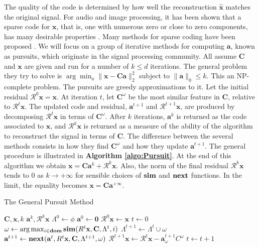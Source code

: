 \documentclass[runningheads,a4paper]{llncs}
\begin{document}
The quality of the code is determined by how well the reconstruction $\hat{\textbf{x}}$ matches the original signal. For audio and image processing, it has been shown that a sparse code for $\textbf{x}$, that is, one with numerous zero or close to zero components, has many desirable properties \cite{emergence-sparse-coding,sparse-coding-strategy-V1}. Many methods for sparse coding have been proposed \cite{undetermined-minimal-L1,sparse-coding-strategy-V1}. We will focus on a group of iterative methods for computing $\textbf{a}$, known as pursuits, which originate in the signal processing community. All assume $\textbf{C}$ and $\textbf{x}$ are given and run for a number of $k \leq d$ iterations. The general problem they try to solve is $\arg\min_a \|\textbf{x} - \textbf{C}\textbf{a}\|_2^2$ subject to $\|\textbf{a}\|_0 \leq k$. This an NP-complete problem. The pursuits are greedy approximations to it. Let the initial residual $\mathcal{R}^0\textbf{x} = \textbf{x}$. At iteration $t$, let $\textbf{C}^\omega$ be the most similar feature in $\textbf{C}$, relative to $\mathcal{R}^t\textbf{x}$. The updated code and residual, $\textbf{a}^{t+1}$ and $\mathcal{R}^{t+1}\textbf{x}$, are produced by decomposing $\mathcal{R}^t\textbf{x}$ in terms of $\textbf{C}^\omega$. After $k$ iterations, $\textbf{a}^k$ is returned as the code associated to $\textbf{x}$, and $\mathcal{R}^k\textbf{x}$ is returned as a measure of the ability of the algorithm to reconstruct the signal in terms of $\textbf{C}$. The difference between the several methods consists in how they find $\textbf{C}^\omega$ and how they update $\textbf{a}^{t+1}$. The general procedure is illustrated in \textbf{Algorithm \ref{algo:Pursuit}}. At the end of this algorithm we obtain $\textbf{x} = \textbf{C}\textbf{a}^k + \mathcal{R}^k\textbf{x}$. Also, the norm of the final residual $\mathcal{R}^k\textbf{x}$ tends to $0$ as $k \rightarrow +\infty$ for sensible choices of $\text{\textbf{sim}}$ and $\text{\textbf{next}}$ functions. In the limit, the equality becomes $\textbf{x} = \textbf{C}\textbf{a}^{+\infty}$. 

\begin{algorithm}
\caption{The General Pursuit Method}
\label{algo:Pursuit}
\begin{algorithmic}
\Require $\textbf{C},\textbf{x},k$
\Ensure $\textbf{a}^k,\mathcal{R}^k\textbf{x}$
\State $\Lambda^0 \gets \phi$
\State $\textbf{a}^0 \gets \textbf{0}$
\State $\mathcal{R}^0\textbf{x} \gets \textbf{x}$
\State $t \gets 0$
\State $\omega \gets \arg \max_{i \in \textbf{dom}} \text{\textbf{sim}}(R^t\textbf{x},\textbf{C},\Lambda^t,i)$
\State $\Lambda^{t+1} \gets \Lambda^t \cup \omega$
\State $\textbf{a}^{t+1} \gets \text{\textbf{next}}(\textbf{a}^t,R^t\textbf{x},\textbf{C},\Lambda^{t+1},\omega)$
\State $\mathcal{R}^{t+1}\textbf{x} \gets \mathcal{R}^t\textbf{x} - \textbf{a}^{t+1}_\omega C^\omega$
\State $t \gets t + 1$
\EndWhile
\end{algorithmic}
\end{algorithm}
\end{document}
